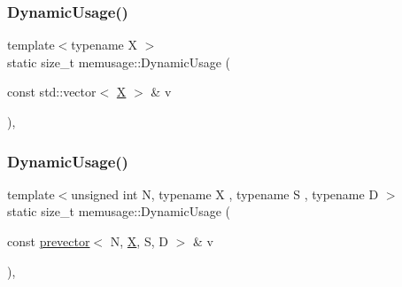 \mbox{\label{namespacememusage_a1a75fc98190774a5cfa16fc700275660}} 
\subsubsection{\texorpdfstring{Dynamic\+Usage()}{DynamicUsage()}\hspace{0.1cm}{\footnotesize\ttfamily [13/18]}}
{\footnotesize\ttfamily template$<$typename X $>$ \\
static size\+\_\+t memusage\+::\+Dynamic\+Usage (\begin{DoxyParamCaption}\item[{const std\+::vector$<$ \mbox{\hyperlink{net_8cpp_a826edd40636cbaa44266b97c8c6a4fa3}{X}} $>$ \&}]{v }\end{DoxyParamCaption})\hspace{0.3cm}{\ttfamily [inline]}, {\ttfamily [static]}}

\mbox{\label{namespacememusage_af74ab663a1abdcb9fe3df1f3bbfe02ff}} 
\subsubsection{\texorpdfstring{Dynamic\+Usage()}{DynamicUsage()}\hspace{0.1cm}{\footnotesize\ttfamily [14/18]}}
{\footnotesize\ttfamily template$<$unsigned int N, typename X , typename S , typename D $>$ \\
static size\+\_\+t memusage\+::\+Dynamic\+Usage (\begin{DoxyParamCaption}\item[{const \mbox{\hyperlink{classprevector}{prevector}}$<$ N, \mbox{\hyperlink{net_8cpp_a826edd40636cbaa44266b97c8c6a4fa3}{X}}, S, D $>$ \&}]{v }\end{DoxyParamCaption})\hspace{0.3cm}{\ttfamily [inline]}, {\ttfamily [static]}}

\mbox{\label{namespacememusage_a3835f97197741f8d3fbc9aa59f96f288}} 
